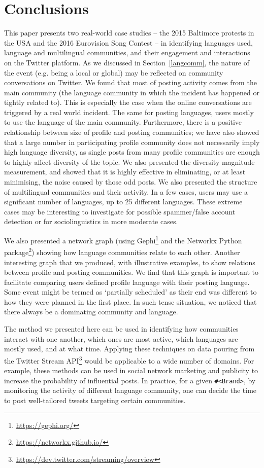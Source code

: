 \section{Conclusions}\label{conclusions}

This paper presents two real-world case studies -- the 2015 Baltimore
protests in the USA and the 2016 Eurovision Song Contest -- in
identifying languages used, language and multilingual communities, and
their engagement and interactions on the Twitter platform. As we
discussed in Section~\ref{langcomm}, the nature of the event
(e.g. being a local or global) may be reflected on community
conversations on Twitter. We found that most of posting activity comes
from the main community (the language community in which the incident
has happened or tightly related to). This is especially the case when
the online conversations are triggered by a real world incident. The
same for posting languages, users mostly to use the language of the
main community. Furthermore, there is a positive
relationship between size of profile and posting communities; we have
also showed that a large number in participating profile community
does not necessarily imply high language diversity, as single posts from many 
profile communities are enough to highly affect diversity of the topic. We 
also presented the diversity magnitude measurement, and showed that it is highly effective in
eliminating, or at least minimising, the noise caused by those odd posts.
We also presented the structure of multilingual communities and their activity. 
In a few cases, users may use a significant number of languages, up to 25 different languages. These
extreme cases may be interesting to investigate for possible
spammer/false account detection or for sociolinguistics in more
moderate cases.

We also presented a network graph (using
Gephi\footnote{\url{https://gephi.org/}} and the Networkx Python
package\footnote{\url{https://networkx.github.io/}}) showing how
language communities relate to each other. Another interesting graph 
that we produced, with illustrative examples, to show relations between 
profile and posting communities. We find that this graph is
important to facilitate comparing users defined profile language with
their posting language. Some event might be termed as `partially
scheduled' as their end was different to how they were planned in the
first place. In such tense situation, we noticed that there always be a
dominating community and language.

The method we presented here can be used in identifying how
communities interact with one another, which ones are most active,
which languages are mostly used, and at what time. Applying these
techniques on data pouring from the Twitter Stream
API\footnote{\url{https://dev.twitter.com/streaming/overview}} would
be applicable to a wide number of domains. For example, these methods
can be used in social network marketing and publicity to increase the
probability of influential posts. In practice, for a given
{\texttt{\#<Brand>}}, by monitoring the activity of different language
community, one can decide the time to post well-tailored tweets
targeting certain communities.


